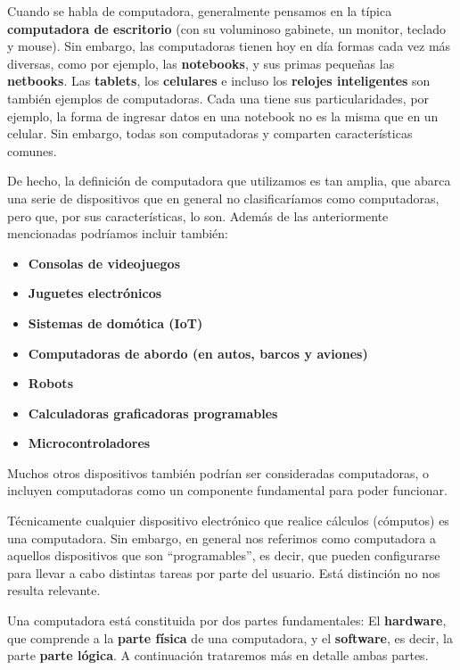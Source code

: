 Cuando se habla de computadora, generalmente pensamos en la típica
\textbf{computadora de escritorio} (con su voluminoso gabinete, un monitor,
teclado y mouse). Sin embargo, las computadoras tienen hoy en día formas cada
vez más diversas, como por ejemplo, las \textbf{notebooks}, y sus primas
pequeñas las \textbf{netbooks}. Las \textbf{tablets}, los \textbf{celulares} e
incluso los \textbf{relojes inteligentes} son también ejemplos de computadoras.
Cada una tiene sus particularidades, por ejemplo, la forma de ingresar datos en
una notebook no es la misma que en un celular. Sin embargo, todas son
computadoras y comparten características comunes.

De hecho, la definición de computadora que utilizamos es tan amplia, que abarca
una serie de dispositivos que en general no clasificaríamos como computadoras,
pero que, por sus características, lo son. Además de las anteriormente
mencionadas podríamos incluir también:

\begin{itemize}
    \item \textbf{Consolas de videojuegos}
    \item \textbf{Juguetes electrónicos}
    \item \textbf{Sistemas de domótica (IoT)}
    \item \textbf{Computadoras de abordo (en autos, barcos y aviones)}
    \item \textbf{Robots}
    \item \textbf{Calculadoras graficadoras programables}
    \item \textbf{Microcontroladores}
\end{itemize}

Muchos otros dispositivos también podrían ser consideradas computadoras, o
incluyen computadoras como un componente fundamental para poder funcionar.
\autocite[introduction]{ceruzzi_2003}

\begin{knowwhat}[En realidad]
Técnicamente cualquier dispositivo electrónico que realice cálculos (cómputos)
es una computadora. Sin embargo, en general nos referimos como computadora a
aquellos dispositivos que son ``programables'', es decir, que pueden
configurarse para llevar a cabo distintas tareas por parte del usuario. Está
distinción no nos resulta relevante.
\end{knowwhat}

Una computadora está constituida por dos partes fundamentales: El
\textbf{hardware}, que comprende a la \textbf{parte física} de una computadora,
y el \textbf{software}, es decir, la parte \textbf{parte lógica}. A continuación
trataremos más en detalle ambas partes.


